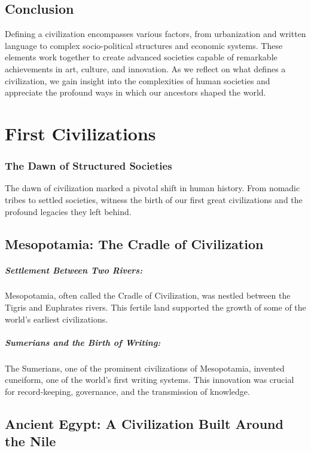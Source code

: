 \documentclass{book}
\begin{document}
\section*{Conclusion}

Defining a civilization encompasses various factors, from urbanization and written language to complex socio-political structures and economic systems. These elements work together to create advanced societies capable of remarkable achievements in art, culture, and innovation. As we reflect on what defines a civilization, we gain insight into the complexities of human societies and appreciate the profound ways in which our ancestors shaped the world.

\chapter{First Civilizations}
\subsection*{The Dawn of Structured Societies}
The dawn of civilization marked a pivotal shift in human history. From nomadic tribes to settled societies, witness the birth of our first great civilizations and the profound legacies they left behind.

\section*{Mesopotamia: The Cradle of Civilization}

\paragraph{Settlement Between Two Rivers:}
Mesopotamia, often called the Cradle of Civilization, was nestled between the Tigris and Euphrates rivers. This fertile land supported the growth of some of the world's earliest civilizations.

\paragraph{Sumerians and the Birth of Writing:}
The Sumerians, one of the prominent civilizations of Mesopotamia, invented cuneiform, one of the world's first writing systems. This innovation was crucial for record-keeping, governance, and the transmission of knowledge.

\section*{Ancient Egypt: A Civilization Built Around the Nile}
\end{document}
